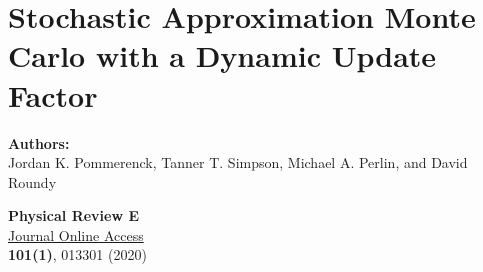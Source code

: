 \chapter{Stochastic Approximation Monte Carlo with a Dynamic Update
Factor}

\vspace*{2.0cm}

\textbf{Authors:} \\
Jordan K. Pommerenck, Tanner T. Simpson, Michael A. Perlin,
and David Roundy

\vspace*{4.0cm}

\textbf{Physical Review E} \\
\href{https://doi.org/10.1103/PhysRevE.101.013301}{Journal Online Access} \\
\textbf{101(1)}, 013301 (2020)~\cite{pommerenck2020stochastic}

\clearpage{}

